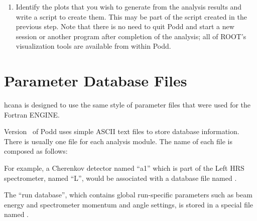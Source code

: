 {{\begin{enumerate}
	previous experiment, or one of the examples in
	the directory , can serve as a guide.
	The script usually also locates raw data files, creates
	one or more  objects, configures various
	options of the event loop object , and
	starts the replay. In particular, the names of the output
	file, the output definition file, and the logicals definition
	file must be given to .
  \item Identify the plots that you wish to generate from the analysis
        results and write a script to create them. This may be part
	of the script created in the previous step.
	Note that there is no need to quit Podd and start a new
	session or another program after completion of the analysis; all of
	ROOT's visualization tools are available from within Podd.
\end{enumerate}

\section{Parameter Database Files}
\label{offl:sec:database}
hcana is designed to use the same style of parameter files that were
used for the Fortran ENGINE.

Version \cppaver\ of Podd uses simple ASCII text files
to store database information. There is usually one file for each
analysis module. The name of each file is composed as follows:\\

\noindent {}
\vspace{2ex}

For example, a Cherenkov detector named ``a1'' which is part of the
Left HRS spectrometer, named ``L'', would be associated with
a database file named .

The ``run database'', which contains global run-specific parameters
such as beam energy and spectrometer momentum and angle settings,
is stored in a special file named .

}}
